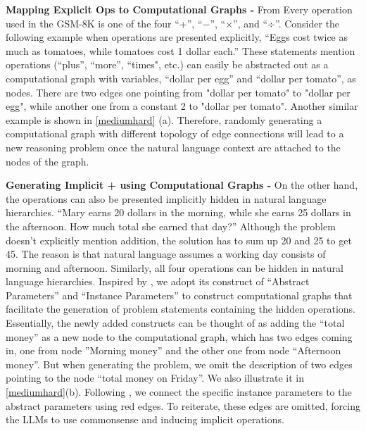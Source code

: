 \textbf{Mapping Explicit Ops to Computational Graphs - } From Every operation used in the GSM-8K is one of the four ``+”, ``$-$”, ``×”, and ``÷”. Consider the following example when operations are presented explicitly, ``Eggs cost twice as much as tomatoes, while tomatoes cost 1 dollar each.” These statements mention operations (``plus”, ``more”, ``times", etc.) can easily be abstracted out as a computational graph with variables, 
``dollar per egg” and ``dollar per tomato”, as nodes. There are two edges one pointing from "dollar per tomato" to "dollar per egg", while another one from a constant 2 to "dollar per tomato". Another similar example is shown in \cref{mediumhard} (a). 
Therefore, randomly generating a computational graph with different topology of edge connections will
lead to a new reasoning problem once the natural language
context are attached to the nodes of the graph. 

\textbf{Generating Implicit + using Computational Graphs - } On the other hand, the operations can also be presented implicitly hidden in natural language hierarchies. ``Mary earns 20 dollars in the morning, while she earns 25 dollars in the afternoon. How much total she earned that day?” Although the problem doesn’t explicitly mention addition, the solution has to sum up 20 and 25 to get 45. The reason is that natural language assumes a working day consists of morning and afternoon. Similarly, all four operations can be hidden in natural language hierarchies. Inspired by \citet{ye2024physicslanguagemodels21},
we adopt its construct of ``Abstract Parameters” and ``Instance Parameters” to construct computational graphs that facilitate the generation of problem statements containing the hidden operations. Essentially, the newly added constructs can be thought of as adding the ``total money” as a new node to the computational graph, which has two edges coming in, one from node ”Morning money” and the other one from node ``Afternoon money”. But when generating the problem, we omit the description of two edges pointing to the node ``total money on Friday”. We also illustrate it in \cref{mediumhard}(b). Following \cite{ye2024physicslanguagemodels21}, we connect the specific instance parameters to the abstract parameters using red edges. To reiterate, these edges are omitted, forcing the LLMs to use commonsense and inducing implicit operations. 

